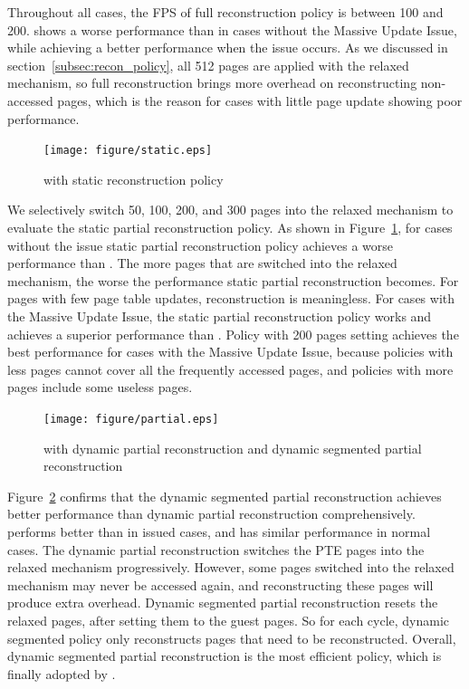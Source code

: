 Throughout all cases, the FPS of full reconstruction policy is between 100 and 200.
\name{} shows a worse performance than \gvirt{} in cases without the Massive Update Issue, while achieving a better performance when the issue occurs.
As we discussed in section~\ref{subsec:recon_policy}, all 512 pages are applied with the relaxed mechanism, so full reconstruction brings more overhead
on reconstructing non-accessed pages, which is the reason for cases with little page update showing poor performance.

\begin{figure}[!htb]
  \centering
  \texttt{[image: figure/static.eps]}\\
  \caption{\name{} with static reconstruction policy}
  \label{fig:static}
\end{figure}

We selectively switch 50, 100, 200, and 300 pages into the relaxed mechanism to evaluate the static partial reconstruction policy.
As shown in Figure~\ref{fig:static}, for cases without the issue static partial reconstruction policy achieves a worse performance than \gvirt{}.
The more pages that are switched into the relaxed mechanism, the worse the performance static partial reconstruction becomes.
For pages with few page table updates, reconstruction is meaningless. For cases with the Massive Update Issue, the static partial reconstruction
policy works and achieves a superior performance than \gvirt{}. Policy with 200 pages setting achieves the best performance for cases with the
Massive Update Issue, because policies with less pages cannot cover all the frequently accessed pages,
and policies with more pages include some useless pages.


\begin{figure}[htbp]
  \centering
  \texttt{[image: figure/partial.eps]}\\
  \caption{\name{} with dynamic partial reconstruction and dynamic segmented partial reconstruction}
  \label{fig:partial}
\end{figure}

Figure~\ref{fig:partial} confirms that the dynamic segmented partial reconstruction achieves better performance than dynamic partial reconstruction
comprehensively. \name{} performs better than \gvirt{} in issued cases, and has similar performance in normal cases.
The dynamic partial reconstruction switches the PTE pages into the relaxed mechanism progressively. However, some pages switched into the relaxed mechanism
may never be accessed again, and reconstructing these pages will produce extra overhead. Dynamic segmented partial reconstruction resets the relaxed pages,
after setting them to the guest pages. So for each cycle, dynamic segmented policy only reconstructs pages that need to be reconstructed.
Overall, dynamic segmented partial reconstruction is the most efficient policy, which is finally adopted by \name{}.

